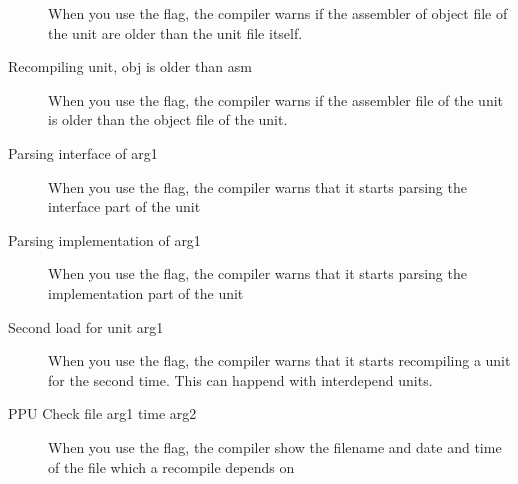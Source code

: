 \begin{description}
 When you use the  flag, the compiler warns if the assembler of
 object file of the unit are older than the unit file itself.
\item [Recompiling unit, obj is older than asm]
 When you use the  flag, the compiler warns if the assembler
 file of the unit is older than the object file of the unit.
\item [Parsing interface of arg1]
 When you use the  flag, the compiler warns that it starts
 parsing the interface part of the unit
\item [Parsing implementation of arg1]
 When you use the  flag, the compiler warns that it starts
 parsing the implementation part of the unit
\item [Second load for unit arg1]
 When you use the  flag, the compiler warns that it starts
 recompiling a unit for the second time. This can happend with interdepend
 units.
\item [PPU Check file arg1 time arg2]
 When you use the  flag, the compiler show the filename and
 date and time of the file which a recompile depends on
 \end{description}

